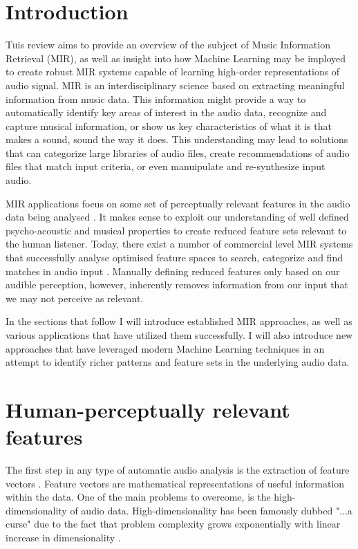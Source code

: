 \documentclass[twoside]{article}
\begin{document}
\begin{multicols}{2} %

\section{Introduction}

\lettrine[nindent=0em,lines=1]{T}his review aims to provide an overview of the subject of Music Information Retrieval (MIR), as well as insight into how Machine Learning
may be imployed to create robust MIR systems capable of learning high-order representations of audio signal. MIR is an interdisciplinary 
science based on extracting meaningful information from music data. This information might provide a way to automatically identify key areas of interest
in the audio data, recognize and capture musical information, or show us key characteristics of what it is that makes a sound, sound the way it does. This understanding may lead to solutions that can categorize large libraries of audio files, create recommendations of audio files that match input criteria, or even manuipulate and re-synthesize input audio.

MIR applications focus on some set of perceptually relevant features in the audio data being analysed \citep{Lidy05,mirSurvey05}. It makes sense to exploit our understanding of well defined psycho-acoustic and musical properties to create reduced feature sets relevant to the human listener. Today, there exist a number of commercial level MIR systems that successfully analyse optimised feature spaces to search, categorize and find matches in audio input \citep{mirSurvey05}. Manually defining reduced features only based on our audible perception, however, inherently removes information from our input that we may not perceive as relevant. 

In the sections that follow I will introduce established MIR approaches, as well as various applications that have utilized them successfully. I will also introduce new approaches that have leveraged modern Machine Learning techniques in an attempt to identify richer patterns and feature sets in the underlying audio data.

\section{Human-perceptually relevant features}
The first step in any type of automatic audio analysis is the extraction of feature vectors \citep{Tzanetakis02}. Feature vectors are mathematical representations of useful information within the data. One of the main problems to overcome, is the high-dimensionality of audio data. High-dimensionality has been famously dubbed "...a curse" \citep{Bellman57} due to the fact that problem complexity grows exponentially with linear increase in dimensionality \citep{DeepLearningSurvey2010}.


\end{multicols}
\end{document}
